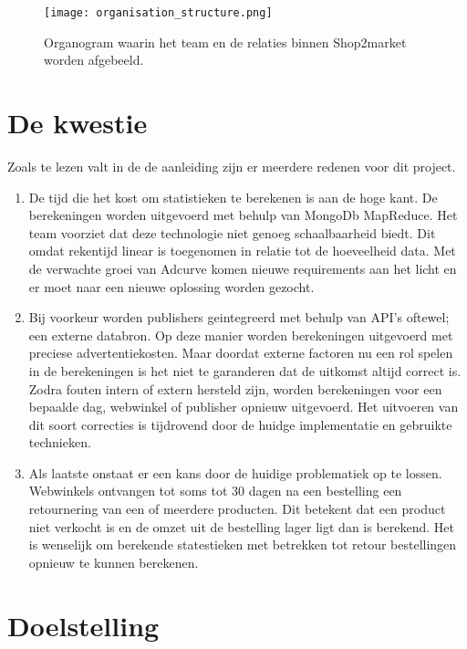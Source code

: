 \begin{figure}[h]
    \texttt{[image: organisation\_structure.png]}
    \caption{Organogram waarin het team en de relaties binnen Shop2market worden afgebeeld.}
    \label{fig:orgchart}
\end{figure}


\clearpage

\section{De kwestie} %

Zoals te lezen valt in de de aanleiding zijn er meerdere redenen voor dit project.

\begin{enumerate}
    \item De tijd die het kost om statistieken te berekenen is aan de hoge kant. De berekeningen worden uitgevoerd met behulp van MongoDb MapReduce. Het team voorziet dat deze technologie niet genoeg schaalbaarheid biedt. Dit omdat rekentijd linear is toegenomen in relatie tot de hoeveelheid data. Met de verwachte groei van Adcurve komen nieuwe requirements aan het licht en er moet naar een nieuwe oplossing worden gezocht.
    \item Bij voorkeur worden publishers geintegreerd met behulp van API's oftewel; een externe databron. Op deze manier worden berekeningen uitgevoerd met preciese advertentiekosten. Maar doordat externe factoren nu een rol spelen in de berekeningen is het niet te garanderen dat de uitkomst altijd correct is. Zodra fouten intern of extern hersteld zijn, worden berekeningen voor een bepaalde dag, webwinkel of publisher opnieuw uitgevoerd. Het uitvoeren van dit soort correcties is tijdrovend door de huidge implementatie en gebruikte technieken.
    \item Als laatste onstaat er een kans door de huidige problematiek op te lossen. Webwinkels ontvangen tot soms tot 30 dagen na een bestelling een retournering van een of meerdere producten. Dit betekent dat een product niet verkocht is en de omzet uit de bestelling lager ligt dan is berekend. Het is wenselijk om berekende statestieken met betrekken tot retour bestellingen opnieuw te kunnen berekenen.
\end{enumerate}


\section{Doelstelling} %

